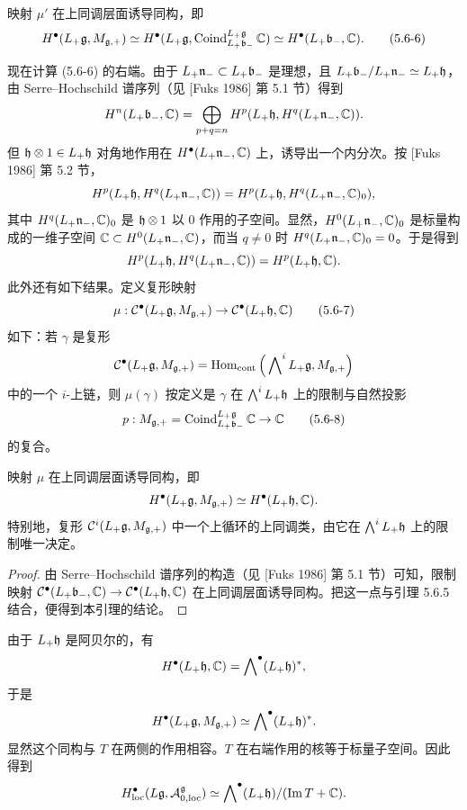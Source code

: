 \begin{lemma}
映射 $\mu'$ 在上同调层面诱导同构，即
\begin{equation}
H^\bullet(L_+\mathfrak{g},M_{\mathfrak{g},+})\simeq H^\bullet(L_+\mathfrak{g},\operatorname{Coind}_{L_+\mathfrak{b}_-}^{L_+\mathfrak{g}}\mathbb{C})\simeq H^\bullet(L_+\mathfrak{b}_-,\mathbb{C}).
\tag{5.6-6}
\end{equation}
\end{lemma}

现在计算 (5.6-6) 的右端。由于 $L_+\mathfrak{n}_-\subset L_+\mathfrak{b}_-$ 是理想，且 $L_+\mathfrak{b}_-/L_+\mathfrak{n}_-\simeq L_+\mathfrak{h}$，由 Serre--Hochschild 谱序列（见 [Fuks 1986] 第 5.1 节）得到
\[
H^n(L_+\mathfrak{b}_-,\mathbb{C}) = \bigoplus_{p+q=n}H^p(L_+\mathfrak{h},H^q(L_+\mathfrak{n}_-,\mathbb{C})).
\]
但 $\mathfrak{h}\otimes 1\in L_+\mathfrak{h}$ 对角地作用在 $H^\bullet(L_+\mathfrak{n}_-,\mathbb{C})$ 上，诱导出一个内分次。按 [Fuks 1986] 第 5.2 节，
\[
H^p(L_+\mathfrak{h},H^q(L_+\mathfrak{n}_-,\mathbb{C})) = H^p(L_+\mathfrak{h},H^q(L_+\mathfrak{n}_-,\mathbb{C})_0),
\]
其中 $H^q(L_+\mathfrak{n}_-,\mathbb{C})_0$ 是 $\mathfrak{h}\otimes 1$ 以 0 作用的子空间。显然，$H^0(L_+\mathfrak{n}_-,\mathbb{C})_0$ 是标量构成的一维子空间 $\mathbb{C}\subset H^0(L_+\mathfrak{n}_-,\mathbb{C})$，而当 $q\ne 0$ 时 $H^q(L_+\mathfrak{n}_-,\mathbb{C})_0 = 0$。于是得到
\[
H^p(L_+\mathfrak{h},H^q(L_+\mathfrak{n}_-,\mathbb{C})) = H^p(L_+\mathfrak{h},\mathbb{C}).
\]
此外还有如下结果。定义复形映射
\begin{equation}
\mu:\mathcal{C}^\bullet(L_+\mathfrak{g},M_{\mathfrak{g},+})\to\mathcal{C}^\bullet(L_+\mathfrak{h},\mathbb{C})
\tag{5.6-7}
\end{equation}
如下：若 $\gamma$ 是复形
\[
\mathcal{C}^\bullet(L_+\mathfrak{g},M_{\mathfrak{g},+}) = \operatorname{Hom}_{\mathrm{cont}}\Big(\bigwedge\nolimits^i L_+\mathfrak{g},M_{\mathfrak{g},+}\Big)
\]
中的一个 $i$-上链，则 $\mu(\gamma)$ 按定义是 $\gamma$ 在 $\bigwedge^i L_+\mathfrak{h}$ 上的限制与自然投影
\begin{equation}
p:M_{\mathfrak{g},+} = \operatorname{Coind}_{L_+\mathfrak{b}_-}^{L_+\mathfrak{g}}\mathbb{C}\to\mathbb{C}
\tag{5.6-8}
\end{equation}
的复合。

\begin{lemma}
映射 $\mu$ 在上同调层面诱导同构，即
\[
H^\bullet(L_+\mathfrak{g},M_{\mathfrak{g},+})\simeq H^\bullet(L_+\mathfrak{h},\mathbb{C}).
\]
特别地，复形 $\mathcal{C}^i(L_+\mathfrak{g},M_{\mathfrak{g},+})$ 中一个上循环的上同调类，由它在 $\bigwedge^i L_+\mathfrak{h}$ 上的限制唯一决定。
\end{lemma}

\begin{proof}
由 Serre--Hochschild 谱序列的构造（见 [Fuks 1986] 第 5.1 节）可知，限制映射 $\mathcal{C}^\bullet(L_+\mathfrak{b}_-,\mathbb{C})\to\mathcal{C}^\bullet(L_+\mathfrak{h},\mathbb{C})$ 在上同调层面诱导同构。把这一点与引理 5.6.5 结合，便得到本引理的结论。
\end{proof}

由于 $L_+\mathfrak{h}$ 是阿贝尔的，有
\[
H^\bullet(L_+\mathfrak{h},\mathbb{C}) = \bigwedge\nolimits^\bullet(L_+\mathfrak{h})^*,
\]
于是
\[
H^\bullet(L_+\mathfrak{g},M_{\mathfrak{g},+})\simeq \bigwedge\nolimits^\bullet(L_+\mathfrak{h})^*.
\]
显然这个同构与 $T$ 在两侧的作用相容。$T$ 在右端作用的核等于标量子空间。因此得到
\[
H^\bullet_{\mathrm{loc}}(L\mathfrak{g},\mathcal{A}^{\mathfrak{g}}_{0,\mathrm{loc}})\simeq \bigwedge\nolimits^\bullet(L_+\mathfrak{h})/(\operatorname{Im} T+\mathbb{C}).
\]


